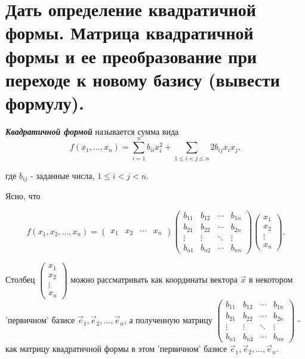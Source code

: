 \section{
    Дать определение квадратичной формы. Матрица квадратичной формы и ее преобразование при переходе к новому базису (вывести формулу).
}

\begin{definition}
    \textbf{\textit{Квадратичной формой}} называется сумма вида $$f(x_1, \ldots, x_n) = \sum_{i=1}^n b_{ii}x_i^2 + \sum_{1 \leq i < j \leq n} 2b_{ij}x_ix_j,$$

    где $b_{ij}$ - заданные числа, $1 \leq i < j < n$.
\end{definition}

Ясно, что

$$
f(x_1, x_2, \ldots, x_n) = 
\begin{pmatrix}
x_1 & x_2 & \cdots & x_n
\end{pmatrix}
\begin{pmatrix}
    b_{11} & b_{12} & \cdots & b_{1n} \\
    b_{21} & b_{22} & \cdots & b_{2n} \\
    \vdots & \vdots & \ddots & \vdots \\
    b_{n1} & b_{n2} & \cdots & b_{nn}
\end{pmatrix}
\begin{pmatrix}
    x_1 \\
    x_2 \\
    \vdots \\
    x_n
\end{pmatrix}.
$$

Столбец $\begin{pmatrix}
    x_1 \\
    x_2 \\
    \vdots \\
    x_n
\end{pmatrix}$ можно рассматривать как координаты вектора $\vec{x}$ в некотором 'первичном' базисе $\vec{e}_1, \vec{e}_2, \ldots, \vec{e}_n$, а полученную матрицу $\begin{pmatrix}
    b_{11} & b_{12} & \cdots & b_{1n} \\
    b_{21} & b_{22} & \cdots & b_{2n} \\
    \vdots & \vdots & \ddots & \vdots \\
    b_{n1} & b_{n2} & \cdots & b_{nn}
\end{pmatrix}$ - как матрицу квадратичной формы в этом 'первичном' базисе $\vec{e}_1, \vec{e}_2, \ldots, \vec{e}_n$. 

